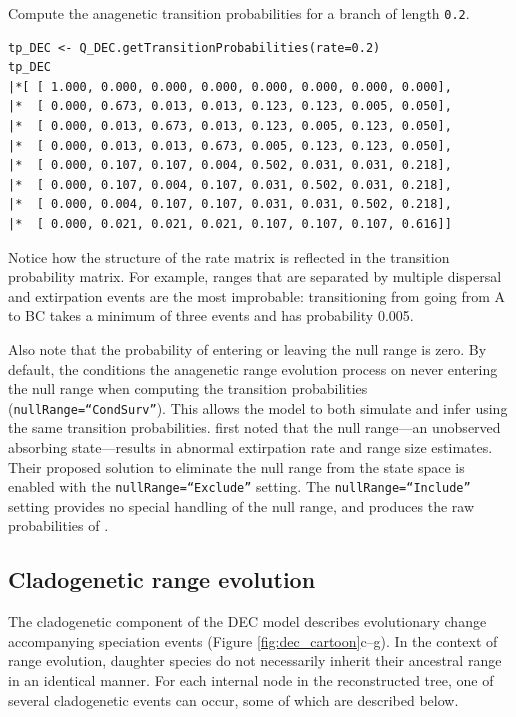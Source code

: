 Compute the anagenetic transition probabilities for a branch of length {\tt 0.2}.

\begin{snugshade}
\begin{lstlisting}
tp_DEC <- Q_DEC.getTransitionProbabilities(rate=0.2)
tp_DEC
|*[ [ 1.000, 0.000, 0.000, 0.000, 0.000, 0.000, 0.000, 0.000],
|*  [ 0.000, 0.673, 0.013, 0.013, 0.123, 0.123, 0.005, 0.050],
|*  [ 0.000, 0.013, 0.673, 0.013, 0.123, 0.005, 0.123, 0.050],
|*  [ 0.000, 0.013, 0.013, 0.673, 0.005, 0.123, 0.123, 0.050],
|*  [ 0.000, 0.107, 0.107, 0.004, 0.502, 0.031, 0.031, 0.218],
|*  [ 0.000, 0.107, 0.004, 0.107, 0.031, 0.502, 0.031, 0.218],
|*  [ 0.000, 0.004, 0.107, 0.107, 0.031, 0.031, 0.502, 0.218],
|*  [ 0.000, 0.021, 0.021, 0.021, 0.107, 0.107, 0.107, 0.616]]
\end{lstlisting}
\end{snugshade}

Notice how the structure of the rate matrix is reflected in the transition probability matrix.
For example, ranges that are separated by multiple dispersal and extirpation events are the most improbable: transitioning from going from A to BC takes a minimum of three events and has probability 0.005.

Also note that the probability of entering or leaving the null range is zero.
By default, the \RevBayes conditions the anagenetic range evolution process on never entering the null range when computing the transition probabilities ({\tt nullRange=``CondSurv''}).
This allows the model to both simulate and infer using the same transition probabilities.
\citet{Massana2015} first noted that the null range---an unobserved absorbing state---results in abnormal extirpation rate and range size estimates.
Their proposed solution to eliminate the null range from the state space is enabled with the {\tt nullRange=``Exclude''} setting. 
The {\tt nullRange=``Include''} setting provides no special handling of the null range, and produces the raw probabilities of \citet{Ree2005}.

\subsection{Cladogenetic range evolution}

The cladogenetic component of the DEC model describes evolutionary change accompanying speciation events (Figure \ref{fig:dec_cartoon}c--g).
In the context of range evolution, daughter species do not necessarily inherit their ancestral range in an identical manner.
For each internal node in the reconstructed tree, one of several cladogenetic events can occur, some of which are described below.

